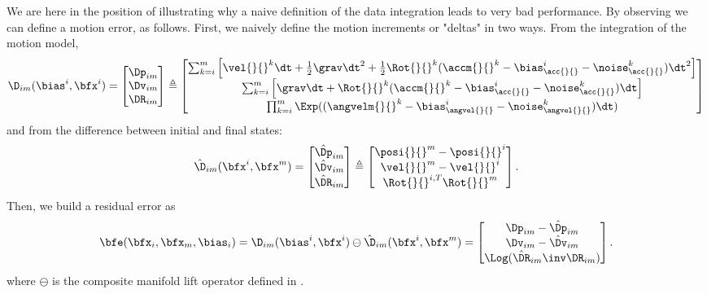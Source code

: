 We are here in the position of illustrating why a naive definition of the data integration leads to very bad performance. 
By observing  we can define a motion error, as follows. 
First, we naively define the motion increments or "deltas"
%
%
in two ways. 
From the integration of the motion model, %
%
\begin{align}
    \D_{im}(\bias^i, \bfx^i) = 
    \begin{bmatrix}
    \Dp_{im}\\ \Dv_{im}\\ \DR_{im}
    \end{bmatrix} \triangleq
    \begin{bmatrix}
    \sum_{k=i}^{m} \Big[\vel{}{}^{k}\dt + \frac{1}{2}\grav \dt^2 
    + \frac{1}{2}\Rot{}{}^{k}(\accm{}{}^k - \bias_{\acc{}{}}^i - \noise_{\acc{}{}}^k)\dt^2 \Big] \\
    \sum_{k=i}^{m} \Big[\grav \dt + \Rot{}{}^{k}(\accm{}{}^k - \bias_{\acc{}{}}^i - \noise_{\acc{}{}}^k)\dt \Big]  \\
    \prod_{k=i}^{m} \Exp((\angvelm{}{}^k - \bias_{\angvel{}{}}^i- \noise_{\angvel{}{}}^k)\dt)  
    \end{bmatrix}
    \label{eq:imu_delta_naive}
\end{align}
%
and from the difference between initial and final states:
%
\begin{align}
    \hat\D_{im}(\bfx^i, \bfx^m) = 
    \begin{bmatrix}
    \hat\Dp_{im}\\ \hat\Dv_{im}\\ \hat\DR_{im}
    \end{bmatrix} \triangleq
    \begin{bmatrix}
    \posi{}{}^{m} - \posi{}{}^{i} \\
    \vel{}{}^{m}  - \vel{}{}^{i}  \\
    \Rot{}{}^{i,T} \Rot{}{}^{m}  
    \end{bmatrix}.
\end{align}
%
Then, we build a residual error as
%
\begin{equation}
    \bfe(\bfx_i, \bfx_m, \bias_i) 
    = \D_{im}(\bias^i, \bfx^i) \ominus \hat\D_{im}(\bfx^i, \bfx^m) =
    \begin{bmatrix}
    \Dp_{im} - \hat\Dp_{im} \\ 
    \Dv_{im} - \hat\Dv_{im} \\ 
    \Log(\hat\DR_{im}\inv \DR_{im}) 
    \end{bmatrix}.
    \label{eq:error_naive_pre-integration}
\end{equation}
%
where $\ominus$ is the composite manifold lift operator defined in .

